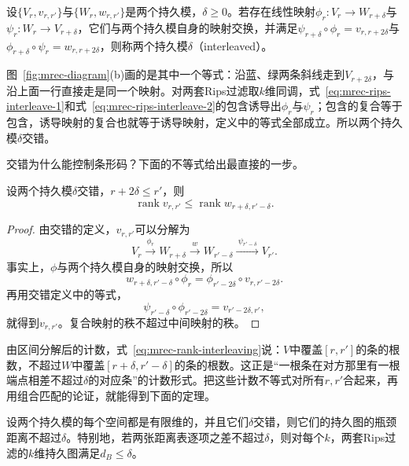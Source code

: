 \begin{definition}[交错]
\label{def:mrec-interleaving}
设$\{V_r,v_{r,r'}\}$与$\{W_r,w_{r,r'}\}$是两个持久模，$\delta\geq0$。若存在线性映射$\phi_r:V_r\to W_{r+\delta}$与$\psi_r:W_r\to V_{r+\delta}$，它们与两个持久模自身的映射交换，并满足$\psi_{r+\delta}\circ\phi_r=v_{r,r+2\delta}$与$\phi_{r+\delta}\circ\psi_r=w_{r,r+2\delta}$，则称两个持久模$\delta$（interleaved）。
\end{definition}

图~\ref{fig:mrec-diagram}(b)画的是其中一个等式：沿蓝、绿两条斜线走到$V_{r+2\delta}$，与沿上面一行直接走是同一个映射。对两套Rips过滤取$k$维同调，式~\eqref{eq:mrec-rips-interleave-1}和式~\eqref{eq:mrec-rips-interleave-2}的包含诱导出$\phi_r$与$\psi_r$；包含的复合等于包含，诱导映射的复合也就等于诱导映射，定义中的等式全部成立。所以两个持久模$\delta$交错。

交错为什么能控制条形码？下面的不等式给出最直接的一步。

\begin{lemma}[秩的比较]
\label{lem:mrec-rank-interleaving}
设两个持久模$\delta$交错，$r+2\delta\leq r'$，则
\begin{equation}
 \operatorname{rank}v_{r,r'}\leq\operatorname{rank}w_{r+\delta,r'-\delta}.
 \label{eq:mrec-rank-interleaving}
\end{equation}
\end{lemma}
\begin{proof}
由交错的定义，$v_{r,r'}$可以分解为
\[
 V_r\xrightarrow{\ \phi_r\ }W_{r+\delta}\xrightarrow{\ w\ }W_{r'-\delta}\xrightarrow{\ \psi_{r'-\delta}\ }V_{r'} .
\]
事实上，$\phi$与两个持久模自身的映射交换，所以
\[
 w_{r+\delta,r'-\delta}\circ\phi_r=\phi_{r'-2\delta}\circ v_{r,r'-2\delta}.
\]
再用交错定义中的等式，
\[
 \psi_{r'-\delta}\circ\phi_{r'-2\delta}=v_{r'-2\delta,r'} ,
\]
就得到$v_{r,r'}$。复合映射的秩不超过中间映射的秩。
\end{proof}

由区间分解后的计数，式~\eqref{eq:mrec-rank-interleaving}说：$V$中覆盖$[r,r']$的条的根数，不超过$W$中覆盖$[r+\delta,r'-\delta]$的条的根数。这正是“一根条在对方那里有一根端点相差不超过$\delta$的对应条”的计数形式。把这些计数不等式对所有$r,r'$合起来，再用组合匹配的论证，就能得到下面的定理。

\begin{theorem}[持久图的稳定性]
\label{thm:mrec-stability}
设两个持久模的每个空间都是有限维的，并且它们$\delta$交错，则它们的持久图的瓶颈距离不超过$\delta$。特别地，若两张距离表逐项之差不超过$\delta$，则对每个$k$，两套Rips过滤的$k$维持久图满足$d_B\leq\delta$。
\end{theorem}

